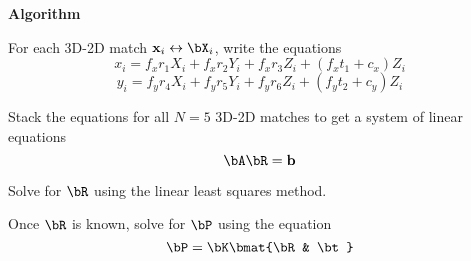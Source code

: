 \begin{answer}
  \newpage
  \step
  \textbf{Algorithm}

  \begin{enumarabic}
    \item For each 3D-2D match $\bx_i \leftrightarrow \bX_i$, write the equations
      \[ x_i = f_x r_1 X_i + f_x r_2 Y_i + f_x r_3 Z_i + (f_x t_1 + c_x) Z_i \]
      \[ y_i = f_y r_4 X_i + f_y r_5 Y_i + f_y r_6 Z_i + (f_y t_2 + c_y) Z_i \]
    \item Stack the equations for all $N = 5$ 3D-2D matches to get a system of linear equations
      \[ \bA \bR = \bb \]
    \item Solve for $\bR$ using the linear least squares method.
    \item Once $\bR$ is known, solve for $\bP$ using the equation
      \[ \bP = \bK \bmat{\bR & \bt} \]
  \end{enumarabic}
\end{answer}
